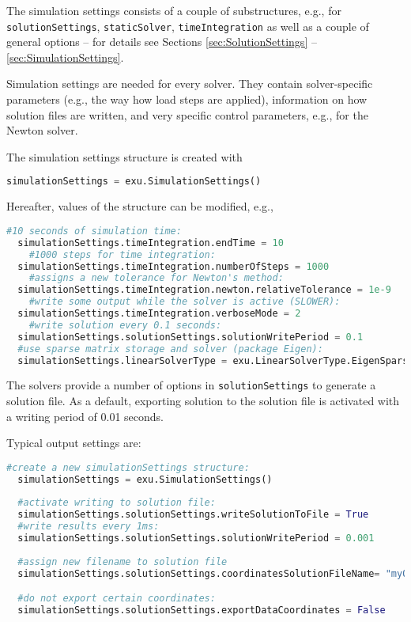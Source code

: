 The simulation settings consists of a couple of substructures, e.g., for \texttt{solutionSettings}, \texttt{staticSolver}, \texttt{timeIntegration} as well as a couple of general options -- for details see Sections \ref{sec:SolutionSettings} -- \ref{sec:SimulationSettings}.

Simulation settings are needed for every solver. They contain solver-specific parameters (e.g., the way how load steps are applied), information on how solution files are written, and very specific control parameters, e.g., for the Newton solver. 

The simulation settings structure is created with 
\pythonstyle
\begin{lstlisting}[language=Python, firstnumber=1]
  simulationSettings = exu.SimulationSettings()
\end{lstlisting}
%
Hereafter, values of the structure can be modified, e.g.,
\begin{lstlisting}[language=Python, firstnumber=1]
	#10 seconds of simulation time:
  simulationSettings.timeIntegration.endTime = 10                    
	#1000 steps for time integration:
  simulationSettings.timeIntegration.numberOfSteps = 1000            
	#assigns a new tolerance for Newton's method:
  simulationSettings.timeIntegration.newton.relativeTolerance = 1e-9 
	#write some output while the solver is active (SLOWER):
  simulationSettings.timeIntegration.verboseMode = 2                 
	#write solution every 0.1 seconds:
  simulationSettings.solutionSettings.solutionWritePeriod = 0.1      
  #use sparse matrix storage and solver (package Eigen):
  simulationSettings.linearSolverType = exu.LinearSolverType.EigenSparse 
\end{lstlisting}

%
The solvers provide a number of options in \texttt{solutionSettings} to generate a solution file. As a default, exporting solution to the solution file is activated with a writing period of 0.01 seconds.

Typical output settings are:
\pythonstyle
\begin{lstlisting}[language=Python, firstnumber=1]
  #create a new simulationSettings structure:
  simulationSettings = exu.SimulationSettings()
	
  #activate writing to solution file:
  simulationSettings.solutionSettings.writeSolutionToFile = True
  #write results every 1ms:
  simulationSettings.solutionSettings.solutionWritePeriod = 0.001
  
  #assign new filename to solution file
  simulationSettings.solutionSettings.coordinatesSolutionFileName= "myOutput.txt"

  #do not export certain coordinates:
  simulationSettings.solutionSettings.exportDataCoordinates = False
\end{lstlisting}



